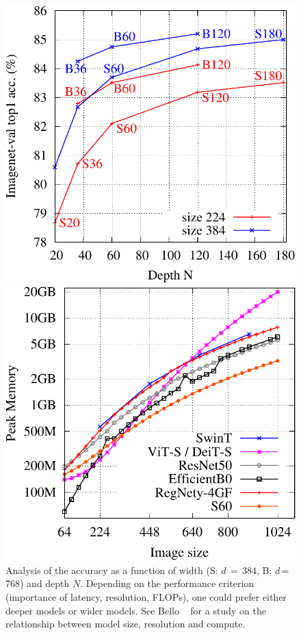 \begin{figure}[h!]
\vspace{-1.5ex}
\begin{minipage}{0.32\linewidth}
\includegraphics[width=\linewidth]{figs/acc_vs_depth_width}
\caption{Analysis of the accuracy as a function of width (S: $d$\,$=$\,$384$, B: $d$\,=\,$768$) and depth $N$. Depending on the performance criterion (importance of latency, resolution, FLOPs), one could prefer either deeper models or wider models. See Bello \etal ~\cite{Bello2021RevisitingRI} for a study on the relationship between model size, resolution and compute. 
\label{fig:acc_vs_depth_width}} 
\end{minipage}
\hfill
\begin{minipage}{0.32\linewidth}
\includegraphics[width=1.02\linewidth]{figs/memory_vs_resolution}

\end{minipage}
\end{figure}

